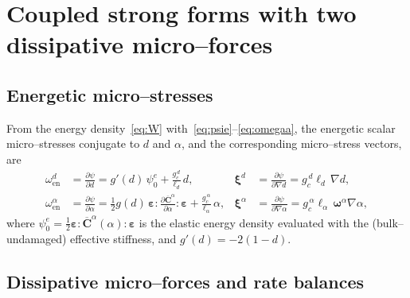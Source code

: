 \documentclass[12pt,a4paper]{article}
\newcommand{\beps}{\boldsymbol{\varepsilon}}
\newcommand{\bxi}{\boldsymbol{\xi}}
\newcommand{\bomega}{\boldsymbol{\omega}}
\newcommand{\Ca}{\overline{\mathbf{C}}^{\alpha}}     %
\begin{document}
	\section{Coupled strong forms with two dissipative micro--forces}\label{sec:strong}

	\subsection{Energetic micro--stresses}

	From the energy density~\eqref{eq:W} with~\eqref{eq:psie}--\eqref{eq:omegaa},
	the energetic scalar micro--stresses conjugate to $d$ and $\alpha$, and the
	corresponding micro--stress vectors, are
	\begin{align}
		\omega_{\mathrm{en}}^{d} &= \frac{\partial\psi}{\partial d}
		= g'(d)\,\psi_0^{e} + \frac{g_c^{\,d}}{\ell_d}\,d,
		& \bxi^{d} &= \frac{\partial\psi}{\partial\nabla d} = g_c^{\,d}\ell_d\,\nabla d, \label{eq:micd}\\[4pt]
		\omega_{\mathrm{en}}^{\alpha} &= \frac{\partial\psi}{\partial\alpha}
		= \tfrac12 g(d)\,\beps:\frac{\partial\Ca}{\partial\alpha}:\beps
		+ \frac{g_c^{\,\alpha}}{\ell_\alpha}\,\alpha,
		& \bxi^{\alpha} &= \frac{\partial\psi}{\partial\nabla\alpha}
		= g_c^{\,\alpha}\ell_\alpha\,\bomega^{\alpha}\nabla\alpha, \label{eq:mica}
	\end{align}
	where $\psi_0^{e}=\tfrac12\beps:\Ca(\alpha):\beps$ is the elastic energy density
	evaluated with the (bulk--undamaged) effective stiffness, and
	$g'(d)=-2(1-d)$.

	\subsection{Dissipative micro--forces and rate balances}
\end{document}
